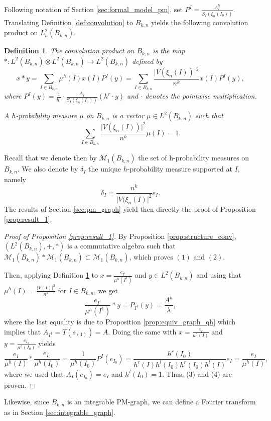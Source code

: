 \documentclass[10pt,11pt]{amsart}%
\newtheorem{definition}[theorem]{Definition}
\begin{document}
Following notation of Section \ref{sec:formal_model_pm}, set $P^I=\frac{A_{I}^h}{S_{I}(\xi_{n}(I_0))}$. Translating Definition \ref{def:convolution} to $B_{k,n}$ yields the following convolution product on $L^2_h(B_{k,n})$.
\begin{definition}\label{def:dft_conv}
The convolution product on $B_{k,n}$ is the map $*:L^2(B_{k,n})\otimes L^2(B_{k,n})\rightarrow L^2(B_{k,n})$ defined by 
$$x\ast y=\sum_{I\in B_{k,n}}\mu^h(I) x(I)P^I(y)=\sum_{I\in B_{k,n}}\frac{\vert V(\xi_{n}(I))\vert^2}{n^k} x(I)P^I(y),$$
where $P^I(y)=\frac{1}{h^r}\cdot \frac{A_I}{S_I(\xi_{n}(I_0))}(h^r\cdot y)$  and $\cdot$ denotes the pointwise multiplication.

A $h$-probability measure $\mu$ on $B_{k,n}$ is a vector $\mu\in L^2(B_{k,n})$ such that 
$$\sum_{I\in B_{k,n}}\frac{\vert V(\xi_{n}(I))\vert^2}{n^k}\mu(I)=1.$$
\end{definition}
Recall that we denote then by $\mathcal{M}_1(B_{k,n})$ the set of h-probability measures on $B_{k,n}$. We also denote by $\delta_I$ the unique $h$-probability measure supported at $I$, namely
\begin{equation}\label{eq:definition_dirac}
\delta_I=\frac{n^k}{\vert V(\xi_{n}(I)\vert^2}e_I.
\end{equation}
The results of Section \ref{sec:pm_graph} yield then directly the proof of Proposition \ref{prop:result_1}.
\begin{proof}[Proof of Proposition \ref{prop:result_1}]
By Proposition \ref{prop:structure_conv}, $(L^2(B_{k,n}),+,*)$ is a commutative algebra such that $\mathcal{M}_1(B_{k,n})*\mathcal{M}_1(B_{k,n})\subset \mathcal{M}_1(B_{k,n})$, which proves $(1)$ and $(2)$. 

Then, applying Definition \ref{def:dft_conv} to $x=\frac{e_{I^1}}{\mu^h(I^1)}$ and $y\in L^2(B_{k,n})$ and using that $\mu^h(I)=\frac{\vert V(I)\vert^2}{n^k}$ for $I\in B_{k,n}$, we get
$$\frac{e_{I^1}}{\mu^h(I^1)}\ast y=P_{I^1}(y)=\frac{A^h}{\lambda},$$
where the last equality is due to Proposition \ref{prop:equiv_graph_qh} which implies that $A_{I^1}=T(s_{(1)})=A$. Doing the same with $x=\frac{e_I}{\mu^h(I)}$ and $y=\frac{e_{I_0}}{\mu^h(I_0)}$ yields 
$$\frac{e_{I}}{\mu^h(I)}\ast \frac{e_{I_0}}{\mu^h(I_0)}=\frac{1}{\mu^h(I_0)}P^I(e_{I_0})=\frac{h^r(I_0)}{h^r(I)h^l(I_0)h^r(I_0)h^l(I)}e_I=\frac{e_I}{\mu^h(I)},$$
where we used that $A_{I}(e_{I_0})=e_{I}$ and $h^l(I_0)=1$. Thus, (3) and (4) are proven.
\end{proof}
Likewise, since $B_{k,n}$ is an integrable PM-graph, we can define a Fourier transform as in Section \ref{sec:integrable_graph}. 
\end{document}
